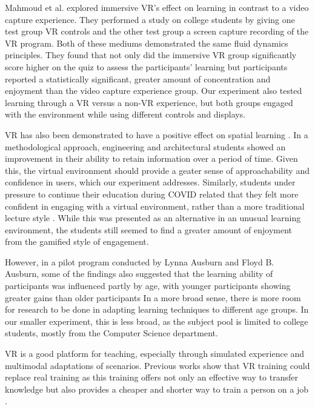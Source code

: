 \documentclass[manuscript,screen,review]{acmart}
\begin{document}
Mahmoud et al. \cite{mahmoud2020does} explored immersive VR’s effect on learning in contrast to a video capture experience. They performed a study on college students by giving one test group VR controls and the other test group a screen capture recording of the VR program. Both of these mediums demonstrated the same fluid dynamics principles. They found that not only did the immersive VR group significantly score higher on the quiz to assess the participants’ learning but participants reported a statistically significant, greater amount of concentration and enjoyment than the video capture experience group. Our experiment also tested learning through a VR versus a non-VR experience, but both groups engaged with the environment while using different controls and displays.

VR has also been demonstrated to have a positive effect on spatial learning \cite{molina2018virtual}. In a methodological approach, engineering and architectural students showed an improvement in their ability to retain information over a period of time. Given this, the virtual environment should provide a geater sense of approachability and confidence in users, which our experiment addresses. Similarly, students under pressure to continue their education during COVID related that they felt more confident in engaging with a virtual environment, rather than a more traditional lecture style \cite{perez2022can}. While this was presented as an alternative in an unusual learning environment, the students still seemed to find a greater amount of enjoyment from the gamified style of engagement.

However, in a pilot program conducted by Lynna Ausburn and Floyd B. Ausburn, some of the findings also suggested that the learning ability of participants was influenced partly by age, with younger participants showing greater gains than older participants \cite{ausburn2008effects} In a more broad sense, there is more room for research to be done in adapting learning techniques to different age groups. In our smaller experiment, this is less broad, as the subject pool is limited to college students, mostly from the Computer Science department.

VR is a good platform for teaching, especially through simulated experience and multimodal adaptations of scenarios. Previous works show that VR training could replace real training as this training offers not only an effective way to transfer knowledge but also provides a cheaper and shorter way to train a person on a job \cite{martin2022multimodality}. 
\end{document}
